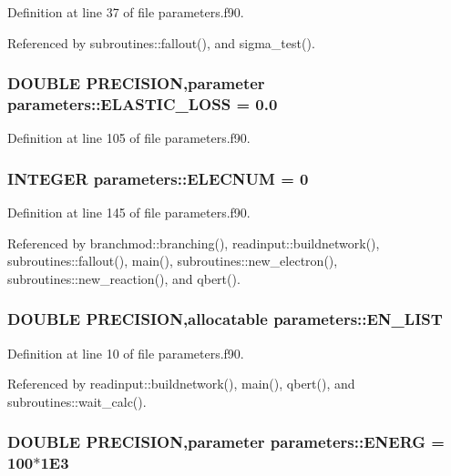 Definition at line 37 of file parameters.f90.

Referenced by subroutines::fallout(), and sigma\_\-test().\hypertarget{namespaceparameters_aa477d24fa30c94e4765d70da20e987e7}{
\subsubsection[{ELASTIC\_\-LOSS}]{\setlength{\rightskip}{0pt plus 5cm}DOUBLE PRECISION,parameter {\bf parameters::ELASTIC\_\-LOSS} = 0.0}}
\label{namespaceparameters_aa477d24fa30c94e4765d70da20e987e7}


Definition at line 105 of file parameters.f90.\hypertarget{namespaceparameters_aff13458f35487137bc22ea99de38e60a}{
\subsubsection[{ELECNUM}]{\setlength{\rightskip}{0pt plus 5cm}INTEGER {\bf parameters::ELECNUM} = 0}}
\label{namespaceparameters_aff13458f35487137bc22ea99de38e60a}


Definition at line 145 of file parameters.f90.

Referenced by branchmod::branching(), readinput::buildnetwork(), subroutines::fallout(), main(), subroutines::new\_\-electron(), subroutines::new\_\-reaction(), and qbert().\hypertarget{namespaceparameters_a41b06e1dd582bb56419bf991f2c633e3}{
\subsubsection[{EN\_\-LIST}]{\setlength{\rightskip}{0pt plus 5cm}DOUBLE PRECISION,allocatable {\bf parameters::EN\_\-LIST}}}
\label{namespaceparameters_a41b06e1dd582bb56419bf991f2c633e3}


Definition at line 10 of file parameters.f90.

Referenced by readinput::buildnetwork(), main(), qbert(), and subroutines::wait\_\-calc().\hypertarget{namespaceparameters_a3a8aa693f08c619d7a21b16784fc6cfe}{
\subsubsection[{ENERG}]{\setlength{\rightskip}{0pt plus 5cm}DOUBLE PRECISION,parameter {\bf parameters::ENERG} = 100$\ast$1E3}}
\label{namespaceparameters_a3a8aa693f08c619d7a21b16784fc6cfe}



